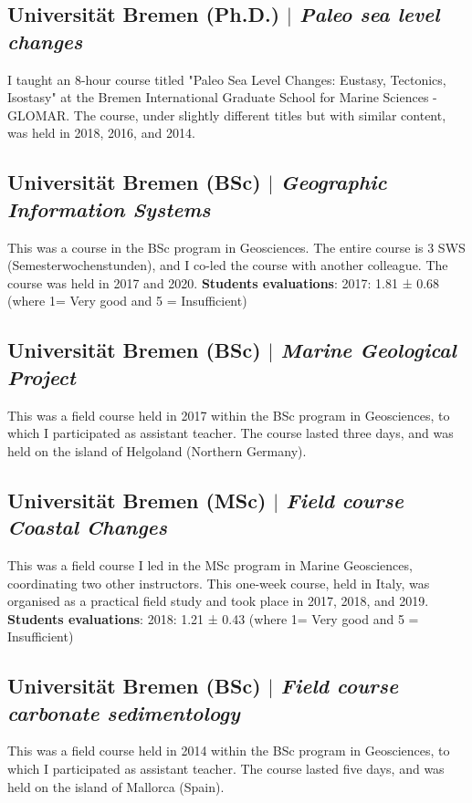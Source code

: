 \documentclass[11pt]{article}
\begin{document}
\subsection{Universität Bremen (Ph.D.) $|$ {\normalfont\textit{Paleo sea level changes}}}
{\footnotesize I taught an 8-hour course titled "Paleo Sea Level Changes: Eustasy, Tectonics, Isostasy" at the Bremen International Graduate School for Marine Sciences - GLOMAR. The course, under slightly different titles but with similar content, was held in 2018, 2016, and 2014.}
\bigskip

\subsection{Universität Bremen (BSc) $|$ {\normalfont\textit{Geographic Information Systems}}}
{\footnotesize This was a course in the BSc program in Geosciences. The entire course is 3 SWS (Semesterwochenstunden), and I co-led the course with another colleague. The course was held in 2017 and 2020. 
\textbf{Students evaluations}: 2017: 1.81 ± 0.68 (where 1= Very good and 5 = Insufficient)}
\bigskip

\subsection{Universität Bremen (BSc) $|$ {\normalfont\textit{Marine Geological Project}}}
{\footnotesize This was a field course held in 2017 within the BSc program in Geosciences, to which I participated as assistant teacher. The course lasted three days, and was held on the island of Helgoland (Northern Germany).}
\bigskip

\subsection{Universität Bremen (MSc) $|$ {\normalfont\textit{Field course Coastal Changes}}}
{\footnotesize This was a field course I led in the MSc program in Marine Geosciences, coordinating two other instructors. This one-week course, held in Italy, was organised as a practical field study and took place in 2017, 2018, and 2019.
\textbf{Students evaluations}: 2018: 1.21 ± 0.43 (where 1= Very good and 5 = Insufficient)}
\bigskip

\subsection{Universität Bremen (BSc) $|$ {\normalfont\textit{Field course carbonate sedimentology}}}
{\footnotesize This was a field course held in 2014 within the BSc program in Geosciences, to which I participated as assistant teacher. The course lasted five days, and was held on the island of Mallorca (Spain).}
\bigskip
\end{document}
